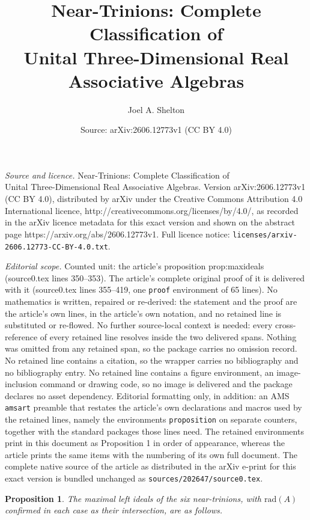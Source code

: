 \documentclass[10pt,a4paper]{amsart}
\title{Near-Trinions: Complete Classification of\\ Unital Three-Dimensional Real Associative Algebras}
\author{Joel A. Shelton}
\date{Source: arXiv:2606.12773v1 (CC BY 4.0)}
\newtheorem{proposition}{Proposition}
\newcommand{\Jac}{\mathrm{rad}}
\begin{document}
\maketitle

\noindent\emph{Source and licence.} Near-Trinions: Complete Classification of\\ Unital Three-Dimensional Real Associative Algebras. Version arXiv:2606.12773v1 (CC BY 4.0), distributed by arXiv under the Creative Commons Attribution 4.0 International licence, http://creativecommons.org/licenses/by/4.0/, as recorded in the arXiv licence metadata for this exact version and shown on the abstract page https://arxiv.org/abs/2606.12773v1. Full licence notice: \texttt{licenses/arxiv-2606.12773-CC-BY-4.0.txt}.\par\smallskip

\noindent\textit{Editorial scope.} Counted unit: the article's proposition prop:maxideals (source0.tex lines 350--353). The article's complete original proof of it is delivered with it (source0.tex lines 355--419, one \texttt{proof} environment of 65 lines). No mathematics is written, repaired or re-derived: the statement and the proof are the article's own lines, in the article's own notation, and no retained line is substituted or re-flowed.  No further source-local context is needed: every cross-reference of every retained line resolves inside the two delivered spans.  Nothing was omitted from any retained span, so the package carries no omission record.  No retained line contains a citation, so the wrapper carries no bibliography and no bibliography entry.  No retained line contains a figure environment, an image-inclusion command or drawing code, so no image is delivered and the package declares no asset dependency.  Editorial formatting only, in addition: an AMS \texttt{amsart} preamble that restates the article's own declarations and macros used by the retained lines, namely the environments \texttt{proposition} on separate counters, together with the standard packages those lines need.  The retained environments print in this document as Proposition 1 in order of appearance, whereas the article prints the same items with the numbering of its own full document.  The complete native source of the article as distributed in the arXiv e-print for this exact version is bundled unchanged as \texttt{sources/202647/source0.tex}.
\begin{proposition}\label{prop:maxideals}
  The maximal left ideals of the six near-trinions, with $\Jac(A)$
  confirmed in each case as their intersection, are as follows.
\end{proposition}
\end{document}
